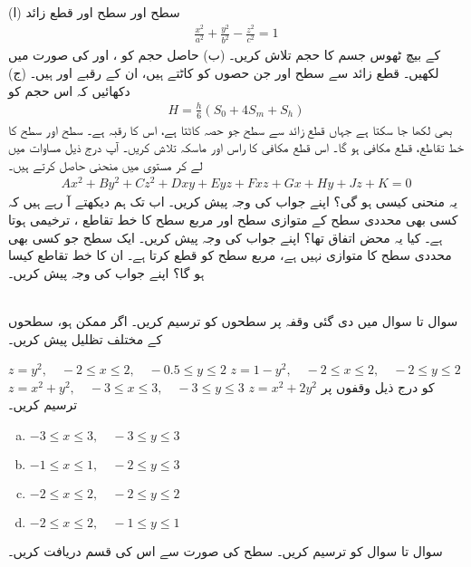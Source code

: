 (ا) سطح  اور سطح  اور قطع زائد
\begin{align*}
\frac{x^2}{a^2}+\frac{y^2}{b^2}-\frac{z^2}{c^2}=1
\end{align*}
کے بیچ  ٹھوس جسم کا حجم تلاش کریں۔ (ب)  حاصل حجم کو ،   اور   کی صورت میں لکھیں۔  قطع زائد سے سطح  اور   جن حصوں کو کاٹتے ہیں، ان کے رقبے  اور  ہیں۔ (ج) دکھائیں کہ اس حجم کو
\begin{align*}
H=\frac{h}{6}(S_0+4S_m+S_h)
\end{align*}
بھی لکھا جا سکتا ہے جہاں قطع زائد سے سطح    جو حصہ کاٹتا ہے، اس کا رقبہ  ہے۔
سطح    اور سطح  کا خط تقاطع،  قطع مکافی ہو گا۔ اس قطع مکافی کا راس اور ماسکہ  تلاش کریں۔
آپ درج ذیل مساوات میں  لے کر مستوی  میں منحنی حاصل کرتے ہیں۔
\begin{align*}
Ax^2+By^2+Cz^2+Dxy+Eyz+Fxz+Gx+Hy+Jz+K=0
\end{align*}
یہ منحنی کیسی ہو گی؟ اپنے جواب کی وجہ پیش کریں۔
اب  تک  ہم دیکھتے آ رہے ہیں کہ کسی بھی محددی  سطح کے متوازی سطح اور مربع سطح کا خط تقاطع ،  ترخیمی ہوتا ہے۔ کیا یہ محض    اتفاق تھا؟ اپنے جواب  کی وجہ پیش کریں۔
ایک سطح جو کسی بھی محددی  سطح کا متوازی نہیں ہے، مربع سطح کو قطع کرتا ہے۔  ان کا خط تقاطع کیسا ہو گا؟ اپنے جواب کی وجہ پیش کریں۔

\\
سوال  تا سوال  میں دی گئی وقفہ پر سطحوں کو ترسیم کریں۔ اگر ممکن ہو، سطحوں کے مختلف تظلیل پیش کریں۔

$z=y^2,\quad -2\le x\le 2,\quad -0.5\le y\le 2$
$z=1-y^2,\quad -2\le x\le 2,\quad -2\le y\le 2$
$z=x^2+y^2,\quad -3\le x\le 3,\quad -3\le y\le 3$
$z=x^2+2y^2$
کو درج ذیل وقفوں پر ترسیم کریں۔
\begin{enumerate}[a.]
\item
$-3\le x\le 3,\quad -3\le y\le 3$
\item
$-1\le x\le 1,\quad -2\le y\le 3$
\item
$-2\le x\le 2,\quad -2\le y\le 2$
\item
$-2\le x\le 2,\quad -1\le y\le 1$
\end{enumerate}
سوال  تا سوال  کو ترسیم کریں۔ سطح کی صورت  سے  اس کی قسم دریافت کریں۔

